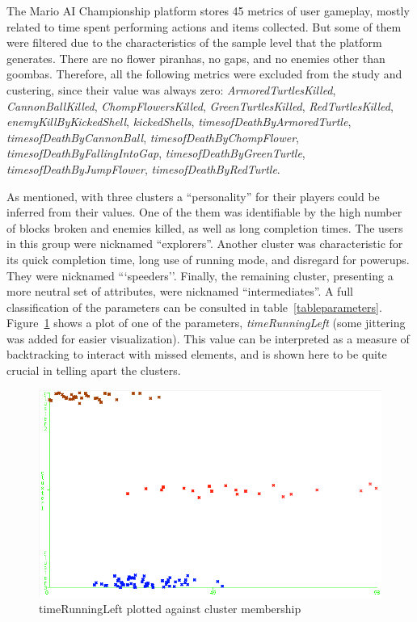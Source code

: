\documentclass[conference]{IEEEtran}
\begin{document}
The Mario AI Championship platform stores 45 metrics of user gameplay, mostly related to time spent performing actions and items collected. But some of them were filtered due to the characteristics of the sample level that the platform generates. There are no flower piranhas, no gaps, and no enemies other than goombas. Therefore, all the following metrics were excluded from the study and custering, since their value was always zero: \textit{ArmoredTurtlesKilled}, \textit{CannonBallKilled}, \textit{ChompFlowersKilled}, \textit{GreenTurtlesKilled}, \textit{RedTurtlesKilled}, \textit{enemyKillByKickedShell}, \textit{kickedShells}, \textit{timesofDeathByArmoredTurtle}, \textit{timesofDeathByCannonBall}, \textit{timesofDeathByChompFlower}, \textit{timesofDeathByFallingIntoGap}, \textit{timesofDeathByGreenTurtle}, \textit{timesofDeathByJumpFlower}, \textit{timesofDeathByRedTurtle}.

As mentioned, with three clusters a ``personality'' for their players could be inferred from their values. One of the them was identifiable by the high number of blocks broken and enemies killed, as well as long completion times. The users in this group were nicknamed ``explorers''. Another cluster was characteristic for its quick completion time, long use of running mode, and disregard for powerups. They were nicknamed ```speeders''. Finally, the remaining cluster, presenting a more neutral set of attributes, were nicknamed ``intermediates''. A full classification of the parameters can be consulted in table~\ref{tableparameters}. Figure~\ref{wekaplot} shows a plot of one of the parameters, \textit{timeRunningLeft} (some jittering was added for easier visualization). This value can be interpreted as a measure of backtracking to interact with missed elements, and is shown here to be quite crucial in telling apart the clusters. 

\begin{figure}[htp]
\centerline{\includegraphics[width=0.9\columnwidth]{timeRunningLeft_.png}}
\caption{timeRunningLeft plotted against cluster membership}
\label{wekaplot}
\end{figure}
\end{document}
